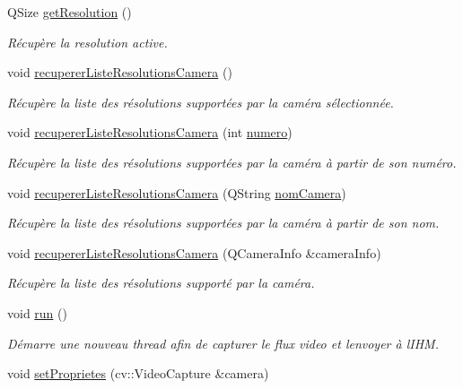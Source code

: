\begin{DoxyCompactItemize}
Q\+Size \hyperlink{class_camera_a9fae9d9b6fa352ff96c9874d9b085454}{get\+Resolution} ()
\begin{DoxyCompactList}\small\item\em Récupère la resolution active. \end{DoxyCompactList}\item 
void \hyperlink{class_camera_a97267488c5756b4217d4e1fbc68008fd}{recuperer\+Liste\+Resolutions\+Camera} ()
\begin{DoxyCompactList}\small\item\em Récupère la liste des résolutions supportées par la caméra sélectionnée. \end{DoxyCompactList}\item 
void \hyperlink{class_camera_acf7554fa133bab58c16192041254a1d6}{recuperer\+Liste\+Resolutions\+Camera} (int \hyperlink{class_camera_ae5cda5df3c9c49b88fff15389a1bbc64}{numero})
\begin{DoxyCompactList}\small\item\em Récupère la liste des résolutions supportées par la caméra à partir de son numéro. \end{DoxyCompactList}\item 
void \hyperlink{class_camera_ae3d1ccb26bcd49340bc392dc1e7bb550}{recuperer\+Liste\+Resolutions\+Camera} (Q\+String \hyperlink{class_camera_ac1cdaf82921d2a2f3f941d867718eba2}{nom\+Camera})
\begin{DoxyCompactList}\small\item\em Récupère la liste des résolutions supportées par la caméra à partir de son nom. \end{DoxyCompactList}\item 
void \hyperlink{class_camera_a4a9f1bcfa19bbd5add6c758c8ad85b5c}{recuperer\+Liste\+Resolutions\+Camera} (Q\+Camera\+Info \&camera\+Info)
\begin{DoxyCompactList}\small\item\em Récupère la liste des résolutions supporté par la caméra. \end{DoxyCompactList}\item 
void \hyperlink{class_camera_aaa3745c0cf0f286ef80b7eeebc248cc9}{run} ()
\begin{DoxyCompactList}\small\item\em Démarre une nouveau thread afin de capturer le flux video et l\textquotesingle{}envoyer à l\textquotesingle{}I\+HM. \end{DoxyCompactList}\item 
void \hyperlink{class_camera_a77397d68d606172ccfafed5624c31213}{set\+Proprietes} (cv\+::\+Video\+Capture \&camera)

\end{DoxyCompactItemize}
